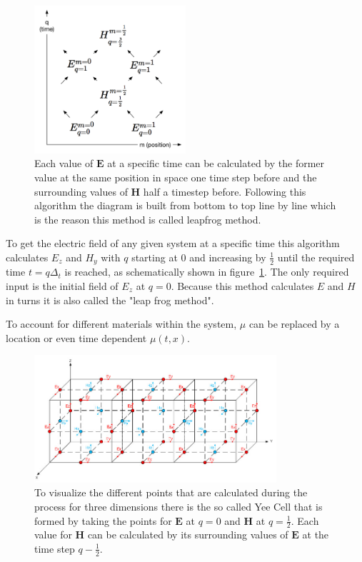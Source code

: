 \begin{figure}[!h]
  \centering
  \includegraphics[width=0.5\textwidth]{./images/space-time-cell.png}
  \caption{Each value of $\mathbf{E}$ at a specific time can be calculated by the former value at the same position in space one time step before and the surrounding values of $\mathbf{H}$ half a timestep before. Following this algorithm the diagram is built from bottom to top line by line which is the reason this method is called leapfrog method.}
  \label{fig:leapfrog}
\end{figure}

To get the electric field of any given system at a specific time this algorithm calculates $E_z$ and $H_y$ with $q$ starting at 0 and increasing by $\frac{1}{2}$ until the required time $t = q\Delta_t$ is reached, as schematically shown in figure~\ref{fig:leapfrog}. The only required input is the initial field of $E_z$ at $q = 0$. Because this method calculates $E$ and $H$ in turns it is also called the "leap frog method".

To account for different materials within the system, $\mu$ can be replaced by a location or even time dependent $\mu(t, x)$.

\begin{figure}[!h]
  \centering
  \includegraphics[width=0.8\textwidth]{./images/yeecell.jpg}
  \caption{To visualize the different points that are calculated during the process for three dimensions there is the so called Yee Cell that is formed by taking the points for $\mathbf{E}$ at $q=0$ and $\mathbf{H}$ at $q=\frac{1}{2}$. Each value for $\mathbf{H}$ can be calculated by its surrounding values of $\mathbf{E}$ at the time step $q-\frac{1}{2}$.}
\end{figure}

